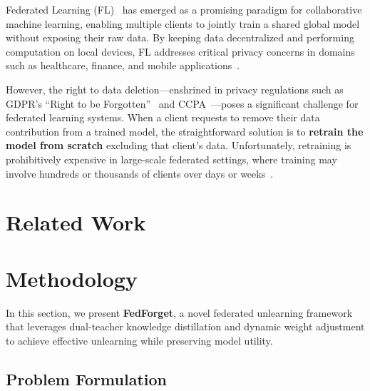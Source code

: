 \documentclass{article}
\begin{document}
Federated Learning (FL)~\cite{mcmahan2017fedavg} has emerged as a promising paradigm for collaborative machine learning, enabling multiple clients to jointly train a shared global model without exposing their raw data. By keeping data decentralized and performing computation on local devices, FL addresses critical privacy concerns in domains such as healthcare, finance, and mobile applications~\cite{kairouz2021advances,li2020fedprox}.

However, the right to data deletion—enshrined in privacy regulations such as GDPR's ``Right to be Forgotten''~\cite{gdpr2018} and CCPA~\cite{ccpa2020}—poses a significant challenge for federated learning systems. When a client requests to remove their data contribution from a trained model, the straightforward solution is to \textbf{retrain the model from scratch} excluding that client's data. Unfortunately, retraining is prohibitively expensive in large-scale federated settings, where training may involve hundreds or thousands of clients over days or weeks~\cite{yang2019federated,bonawitz2019towards}.



\section{Related Work}
\label{sec:related}



\section{Methodology}
\label{sec:method}

In this section, we present \textbf{FedForget}, a novel federated unlearning framework that leverages dual-teacher knowledge distillation and dynamic weight adjustment to achieve effective unlearning while preserving model utility.

\subsection{Problem Formulation}
\label{sec:problem}
\end{document}
